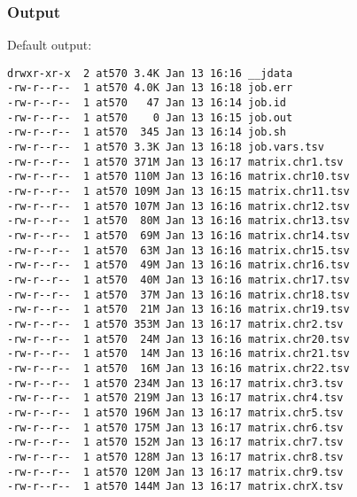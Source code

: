 \subsubsection{Output} %
Default output: %
\begin{lstlisting}
drwxr-xr-x  2 at570 3.4K Jan 13 16:16 __jdata
-rw-r--r--  1 at570 4.0K Jan 13 16:18 job.err
-rw-r--r--  1 at570   47 Jan 13 16:14 job.id
-rw-r--r--  1 at570    0 Jan 13 16:15 job.out
-rw-r--r--  1 at570  345 Jan 13 16:14 job.sh
-rw-r--r--  1 at570 3.3K Jan 13 16:18 job.vars.tsv
-rw-r--r--  1 at570 371M Jan 13 16:17 matrix.chr1.tsv
-rw-r--r--  1 at570 110M Jan 13 16:16 matrix.chr10.tsv
-rw-r--r--  1 at570 109M Jan 13 16:15 matrix.chr11.tsv
-rw-r--r--  1 at570 107M Jan 13 16:16 matrix.chr12.tsv
-rw-r--r--  1 at570  80M Jan 13 16:16 matrix.chr13.tsv
-rw-r--r--  1 at570  69M Jan 13 16:16 matrix.chr14.tsv
-rw-r--r--  1 at570  63M Jan 13 16:16 matrix.chr15.tsv
-rw-r--r--  1 at570  49M Jan 13 16:16 matrix.chr16.tsv
-rw-r--r--  1 at570  40M Jan 13 16:16 matrix.chr17.tsv
-rw-r--r--  1 at570  37M Jan 13 16:16 matrix.chr18.tsv
-rw-r--r--  1 at570  21M Jan 13 16:16 matrix.chr19.tsv
-rw-r--r--  1 at570 353M Jan 13 16:17 matrix.chr2.tsv
-rw-r--r--  1 at570  24M Jan 13 16:16 matrix.chr20.tsv
-rw-r--r--  1 at570  14M Jan 13 16:16 matrix.chr21.tsv
-rw-r--r--  1 at570  16M Jan 13 16:16 matrix.chr22.tsv
-rw-r--r--  1 at570 234M Jan 13 16:17 matrix.chr3.tsv
-rw-r--r--  1 at570 219M Jan 13 16:17 matrix.chr4.tsv
-rw-r--r--  1 at570 196M Jan 13 16:17 matrix.chr5.tsv
-rw-r--r--  1 at570 175M Jan 13 16:17 matrix.chr6.tsv
-rw-r--r--  1 at570 152M Jan 13 16:17 matrix.chr7.tsv
-rw-r--r--  1 at570 128M Jan 13 16:17 matrix.chr8.tsv
-rw-r--r--  1 at570 120M Jan 13 16:17 matrix.chr9.tsv
-rw-r--r--  1 at570 144M Jan 13 16:17 matrix.chrX.tsv
\end{lstlisting}
% 
\clearpage
